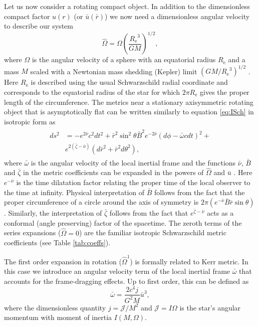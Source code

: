 \documentclass[iop, usenatbib]{emulateapj}
\newcommand{\be}{\begin{equation}}
\newcommand{\ee}{\end{equation}}
\newcommand{\red}[1]{\textcolor{red}{#1}}
\newcommand{\Req}{\ensuremath{R_{\mathrm{e}}}}
\newcommand{\sch}{Schwarzschild }
\newcommand{\rb}{\ensuremath{\bar{r}}}
\renewcommand{\ub}{\ensuremath{\bar{u}}}
\newcommand{\wb}{\ensuremath{\bar{\omega}}}
\newcommand{\Ob}{\ensuremath{\hat{\Omega}}}
\newcommand{\nub}{\ensuremath{\bar{\nu}}}
\newcommand{\zetab}{\ensuremath{\bar{\zeta}}}
\newcommand{\Bb}{\ensuremath{\bar{B}}}
\begin{document}
Let us now consider a rotating compact object.
In addition to the dimensionless compact factor $u(r)$ (or $\ub(\rb)$) we now need a dimensionless angular velocity to describe our system
\be
\Ob = \Omega \left( \frac{\Req^3}{G M} \right)^{1/2},
\ee
where $\Omega$ is the angular velocity of a sphere with an equatorial radius $\Req$ and a mass $M$ scaled with a Newtonian mass shedding (Kepler) limit $(GM/\Req^3)^{1/2}$ \citep[see][p.29]{rcs}.
Here $\Req$ is described using the usual \sch radial coordinate and corresponds to the equatorial radius of the star for which $2\pi\Req$ gives the proper length of the circumference.
The metrics near a stationary axisymmetric rotating object that is asymptotically flat can be written similarly to equation \eqref{eq:ISch} in isotropic form as \citep{BW71} 
\begin{align}\begin{split} \label{eq:BWmetric}
ds^2 & = -e^{2\nub}c^2dt^2 +
     \rb^2 \sin^2\theta \Bb^2 e^{-2\nub}(d\phi - \wb cdt)^2 + \\
     & e^{2(\zetab-\nub)}(d\rb^2 + \rb^2d\theta^2),
\end{split}\end{align}
where $\wb$ is the angular velocity of the local inertial frame and the functions $\nub$, $\Bb$ and $\zetab$ in the metric coefficients can be expanded in the powers of $\Ob$ and $\ub$ \citep{BI76}.
Here $e^{-\nub}$ is the time dilatation factor relating the proper time of the local observer to the time at infinity.
Physical interpretation of $\Bb$ follows from the fact that the proper circumference of a circle around the axis of symmetry is $2\pi(e^{-\nub} \Bb \rb \sin\theta)$.
Similarly, the interpretation of $\zetab$ follows from the fact that $e^{\zetab - \nub}$ acts as a conformal (angle preserving) factor of the spacetime. %
The zeroth terms of the series expansions ($\Ob = 0$) are the familiar isotropic \sch metric coefficients (see Table \ref{tab:coeffs}).

The first order expansion in rotation ($\Ob^1$) is formally related to Kerr metric.
In this case we introduce an angular velocity term of the local inertial frame $\wb$ that accounts for the frame-dragging effects. %
Up to first order, this can be defined as
\be
\wb = \frac{2c^4j}{G^2M}\ub^3,
\ee
where the dimensionless quantity $j=\mathcal{J}/M^2$ and $\mathcal{J} = I \Omega$ is the star's angular momentum with moment of inertia $I(M,\Omega)$.
\end{document}
